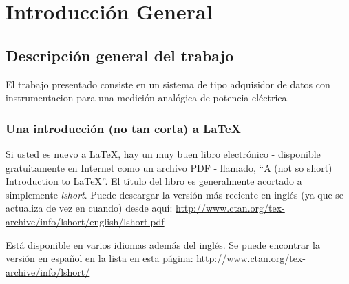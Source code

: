 
\chapter{Introducción General} %

\label{Chapter1} %
\label{IntroGeneral}


\newcommand{\keyword}[1]{\textbf{#1}}
\newcommand{\tabhead}[1]{\textbf{#1}}
\newcommand{\code}[1]{\texttt{#1}}
\newcommand{\file}[1]{\texttt{\bfseries#1}}
\newcommand{\option}[1]{\texttt{\itshape#1}}
\newcommand{\grados}{$^{\circ}$}



\section{Descripción general del trabajo}

El trabajo presentado consiste en un sistema de tipo adquisidor de datos con instrumentacion para una medición analógica de potencia eléctrica.

\subsection{Una introducción (no tan corta) a \LaTeX{}}

Si usted es nuevo a \LaTeX{}, hay un muy buen libro electrónico - disponible gratuitamente en Internet como un archivo PDF - llamado, \enquote{A (not so short) Introduction to \LaTeX{}}. El título del libro es generalmente acortado a simplemente \emph{lshort}. Puede descargar la versión más reciente en inglés (ya que se actualiza de vez en cuando) desde aquí:
\url{http://www.ctan.org/tex-archive/info/lshort/english/lshort.pdf}

Está disponible en varios idiomas además del inglés. Se puede encontrar la versión en español en la lista en esta página: \url{http://www.ctan.org/tex-archive/info/lshort/}



